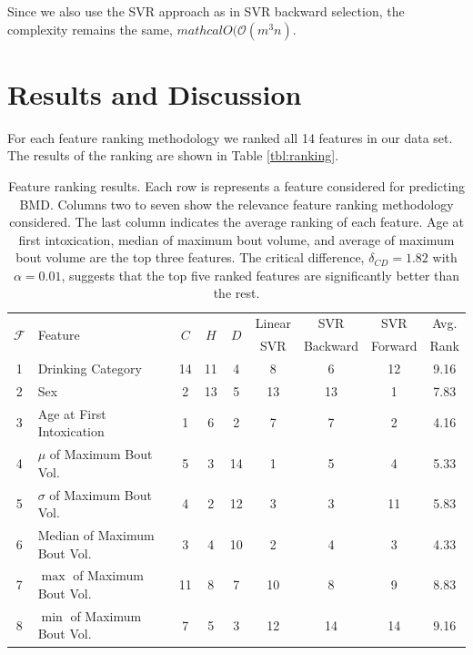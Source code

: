 \documentclass{bmcart}
\begin{document}
Since we also use the SVR approach as in SVR backward selection, the complexity
remains the same, $mathcal{O}(\mathcal{O}(m^3n)$. 


\section*{Results and Discussion}
For each feature ranking methodology we ranked all 14 features in our data set.
The results of the ranking are shown in Table \ref{tbl:ranking}.
\begin{table}[t]
\caption{Feature ranking results. Each row is represents a feature considered
for predicting BMD. Columns two to seven show the relevance feature ranking
methodology considered. The last column indicates the average ranking of each
feature. Age at first intoxication, median of maximum bout volume, and average
of maximum bout volume are the top three features. The critical difference, 
$\delta_{CD}=1.82$ with $\alpha=0.01$, suggests that the top five ranked features are
significantly better than the rest.}
      \begin{tabular}{clccccccc}
        \hline
\multirow{2}{*}{$\mathcal{F}$} & 
\multirow{2}{*}{Feature} & 
\multirow{2}{*}{$C$} &
\multirow{2}{*}{$H$} &
\multirow{2}{*}{$D$} &
Linear &
SVR &
SVR & 
Avg. \\
   &                                 &     &       &     &  SVR & Backward & Forward &  Rank \\ \hline
1  & Drinking Category               &  14 &    11 &   4 &    8 &        6 &      12 &  9.16 \\
2  & Sex                             &   2 &    13 &   5 &   13 &       13 &       1 &  7.83 \\
3  & Age at First Intoxication       &   1 &     6 &   2 &    7 &        7 &       2 &  4.16 \\
4  & $\mu$ of Maximum Bout Vol.      &   5 &     3 &  14 &    1 &        5 &       4 &  5.33 \\
5  & $\sigma$ of Maximum Bout Vol.   &   4 &     2 &  12 &    3 &        3 &      11 &  5.83 \\
6  & Median of Maximum Bout Vol.     &   3 &     4 &  10 &    2 &        4 &       3 &  4.33 \\
7  & $\max$ of Maximum Bout Vol.     &  11 &     8 &   7 &   10 &        8 &       9 &  8.83 \\
8  & $\min$ of Maximum Bout Vol.     &   7 &     5 &   3 &   12 &       14 &      14 &  9.16 \\

\end{tabular}
\end{table}
\end{document}
